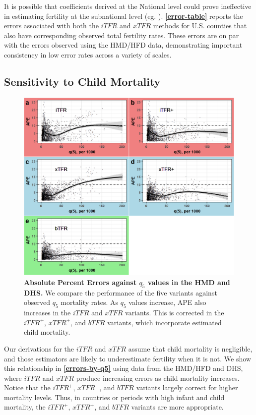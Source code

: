 \documentclass[12pt]{article}
\begin{document}
It is possible that coefficients derived at the National level could
prove ineffective in estimating fertility at the subnational level (eg.
\citet{tuchfeld74}). \textbf{\autoref{error-table}} reports the errors
associated with both the \(iTFR\) and \(xTFR\) methods for U.S. counties
that also have corresponding observed total fertility rates. These
errors are on par with the errors observed using the HMD/HFD data,
demonstrating important consistency in low error rates across a variety
of scales.

\hypertarget{sensitivity-to-child-mortality}{%
\subsection{Sensitivity to Child
Mortality}\label{sensitivity-to-child-mortality}}

\begin{figure}
\centering
\includegraphics{manuscript_files/figure-latex/plot-errors-by-q5-1.png}
\caption{\textbf{Absolute Percent Errors against \(q_5\) values in the
HMD and DHS.} We compare the performance of the five variants against
observed \(q_5\) mortality rates. As \(q_5\) values increase, APE also
increases in the \(iTFR\) and \(xTFR\) variants. This is corrected in
the \(iTFR^+\), \(xTFR^+\), and \(bTFR\) variants, which incorporate
estimated child mortality. \label{errors-by-q5}}
\end{figure}

Our derivations for the \(iTFR\) and \(xTFR\) assume that child
mortality is negligible, and those estimators are likely to
underestimate fertility when it is not. We show this relationship in
\textbf{\autoref{errors-by-q5}} using data from the HMD/HFD and DHS,
where \(iTFR\) and \(xTFR\) produce increasing errors as child mortality
increases. Notice that the \(iTFR^+\), \(xTFR^+\), and \(bTFR\) variants
largely correct for higher mortality levels. Thus, in countries or
periods with high infant and child mortality, the \(iTFR^+\),
\(xTFR^+\), and \(bTFR\) variants are more appropriate.
\end{document}
